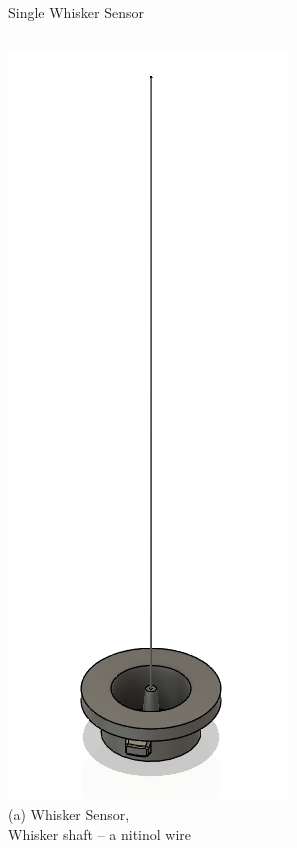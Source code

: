 \documentclass[AIRbeamer
               ,optEnglish
               ,optBiber
               ,optBibstyleAlphabetic
               ,optBeamerClassicFormat%
               ]{AIRlatex}
\begin{document}
\begin{frame}[c]{Single Whisker Sensor}
\centering
\begin{columns}[c,onlytextwidth]
    \centering
    \includegraphics[height=0.6\textheight]{figures/whisker}\\
    (a) Whisker Sensor,\\Whisker shaft -- a nitinol wire
    \centering

\end{columns}
\end{frame}
\end{document}

